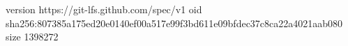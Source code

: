 version https://git-lfs.github.com/spec/v1
oid sha256:807385a175ed20e0140ef00a517e99f3bd611e09bfdec37c8ca22a4021aab080
size 1398272

